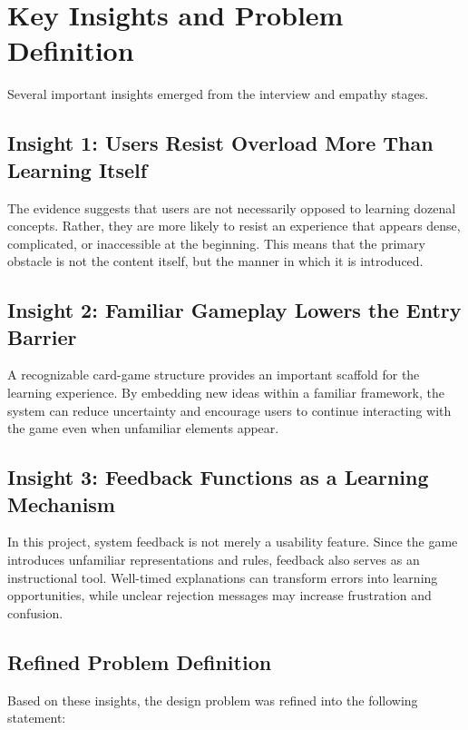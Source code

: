 \documentclass[12pt]{article}
\begin{document}
    \section{Key Insights and Problem Definition}

    Several important insights emerged from the interview and empathy stages.

    \subsection{Insight 1: Users Resist Overload More Than Learning Itself}

    The evidence suggests that users are not necessarily opposed to learning dozenal concepts. Rather, they are more likely to resist an experience that appears dense, complicated, or inaccessible at the beginning. This means that the primary obstacle is not the content itself, but the manner in which it is introduced.

    \subsection{Insight 2: Familiar Gameplay Lowers the Entry Barrier}

    A recognizable card-game structure provides an important scaffold for the learning experience. By embedding new ideas within a familiar framework, the system can reduce uncertainty and encourage users to continue interacting with the game even when unfamiliar elements appear.

    \subsection{Insight 3: Feedback Functions as a Learning Mechanism}

    In this project, system feedback is not merely a usability feature. Since the game introduces unfamiliar representations and rules, feedback also serves as an instructional tool. Well-timed explanations can transform errors into learning opportunities, while unclear rejection messages may increase frustration and confusion.

    \subsection{Refined Problem Definition}

    Based on these insights, the design problem was refined into the following statement:
\end{document}
